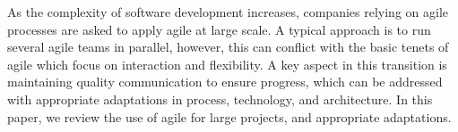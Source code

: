 As the complexity of software development increases, companies relying on agile processes are asked to apply agile at large scale.
A typical approach is to run several agile teams in parallel, however, this can conflict with the basic tenets of agile which focus on interaction and flexibility.
A key aspect in this transition is maintaining quality communication to ensure progress, which can be addressed with appropriate adaptations in process, technology, and architecture.
In this paper, we review the use of agile for large projects, and appropriate adaptations.